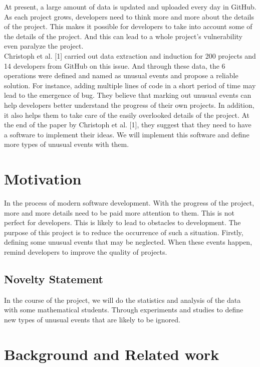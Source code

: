 \documentclass[conference]{IEEEtran}
\begin{document}
At present, a large amount of data is updated and uploaded every day in GitHub. As each project grows, developers need to think more and more about the details of the project. This makes it possible for developers to take into account some of the details of the project. And this can lead to a whole project's vulnerability even paralyze the project.\\

Christoph et al. [1] carried out data extraction and induction for 200 projects and 14 developers from GitHub on this issue. And through these data, the 6 operations were defined and named as unusual events and propose a reliable solution. For instance, adding multiple lines of code in a short period of time may lead to the emergence of bug. They believe that marking out unusual events can help developers better understand the progress of their own projects. In addition, it also helps them to take care of the easily overlooked details of the project. At the end of the paper by Christoph et al. [1], they suggest that they need to have a software to implement their ideas. We will implement this software and define more types of unusual events with them.

\section{Motivation}

In the process of modern software development. With the progress of the project, more and more details need to be paid more attention to them. This is not perfect for developers. This is likely to lead to obstacles to development. The purpose of this project is to reduce the occurrence of such a situation. Firstly, defining some unusual events that may be neglected. When these events happen, remind developers to improve the quality of projects. 

\subsection{Novelty Statement}

In the course of the project, we will do the statistics and analysis of the data with some mathematical students. Through experiments and studies to define new types of unusual events that are likely to be ignored.


\section{Background and Related work}
\end{document}

